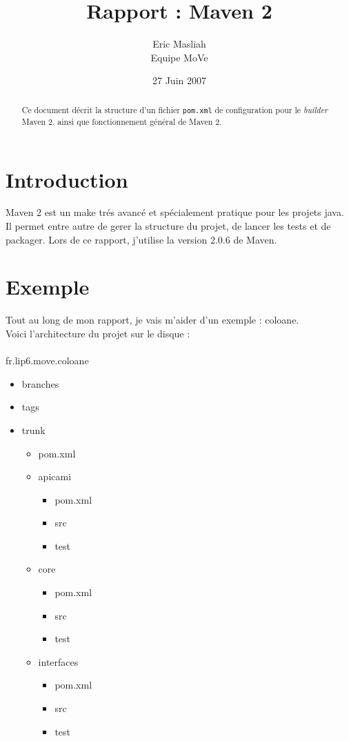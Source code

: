 \documentclass[a4paper,10pt]{article}
\title{Rapport : Maven 2}
\author{Eric Masliah\\
Equipe MoVe}
\date{27 Juin 2007}
\begin{document}
\maketitle

\begin{abstract}
Ce document décrit la structure d'un fichier \texttt{pom.xml} de configuration pour le \textit{builder} Maven 2, ainsi que fonctionnement général de Maven 2.
\end{abstract}

\section{Introduction}
Maven 2 est un make trés avancé et spécialement pratique pour les projets java.
Il permet entre autre de gerer la structure du projet, de lancer les tests et de packager.
Lors de ce rapport, j'utilise la version 2.0.6 de Maven.

\section{Exemple}
Tout au long de mon rapport, je vais m'aider d'un exemple : coloane.\\
Voici l'architecture du projet sur le disque :\\
\\
fr.lip6.move.coloane
\begin{itemize}
  \item branches
  \item tags
  \item trunk
  \begin{itemize}
    \item pom.xml
    \item apicami
      \begin{itemize}
        \item pom.xml
        \item src
        \item test
      \end{itemize}
    \item core
      \begin{itemize}
        \item pom.xml
        \item src
        \item test
      \end{itemize}
    \item interfaces
      \begin{itemize}
        \item pom.xml
        \item src
        \item test
      \end{itemize}
  \end{itemize}
\end{itemize}
\end{document}
